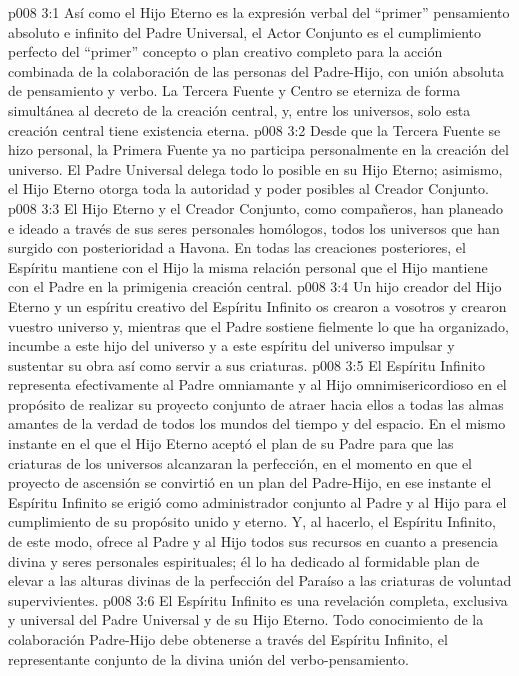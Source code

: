 \vs p008 3:1 Así como el Hijo Eterno es la expresión verbal del “primer” pensamiento absoluto e infinito del Padre Universal, el Actor Conjunto es el cumplimiento perfecto del “primer” concepto o plan creativo completo para la acción combinada de la colaboración de las personas del Padre\hyp{}Hijo, con unión absoluta de pensamiento y verbo. La Tercera Fuente y Centro se eterniza de forma simultánea al decreto de la creación central, y, entre los universos, solo esta creación central tiene existencia eterna.
\vs p008 3:2 Desde que la Tercera Fuente se hizo personal, la Primera Fuente ya no participa personalmente en la creación del universo. El Padre Universal delega todo lo posible en su Hijo Eterno; asimismo, el Hijo Eterno otorga toda la autoridad y poder posibles al Creador Conjunto.
\vs p008 3:3 El Hijo Eterno y el Creador Conjunto, como compañeros, han planeado e ideado a través de sus seres personales homólogos, todos los universos que han surgido con posterioridad a Havona. En todas las creaciones posteriores, el Espíritu mantiene con el Hijo la misma relación personal que el Hijo mantiene con el Padre en la primigenia creación central.
\vs p008 3:4 Un hijo creador del Hijo Eterno y un espíritu creativo del Espíritu Infinito os crearon a vosotros y crearon vuestro universo y, mientras que el Padre sostiene fielmente lo que ha organizado, incumbe a este hijo del universo y a este espíritu del universo impulsar y sustentar su obra así como servir a sus criaturas.
\vs p008 3:5 \pc El Espíritu Infinito representa efectivamente al Padre omniamante y al Hijo omnimisericordioso en el propósito de realizar su proyecto conjunto de atraer hacia ellos a todas las almas amantes de la verdad de todos los mundos del tiempo y del espacio. En el mismo instante en el que el Hijo Eterno aceptó el plan de su Padre para que las criaturas de los universos alcanzaran la perfección, en el momento en que el proyecto de ascensión se convirtió en un plan del Padre\hyp{}Hijo, en ese instante el Espíritu Infinito se erigió como administrador conjunto al Padre y al Hijo para el cumplimiento de su propósito unido y eterno. Y, al hacerlo, el Espíritu Infinito, de este modo, ofrece al Padre y al Hijo todos sus recursos en cuanto a presencia divina y seres personales espirituales; él lo ha dedicado  al formidable plan de elevar a las alturas divinas de la perfección del Paraíso a las criaturas de voluntad supervivientes.
\vs p008 3:6 El Espíritu Infinito es una revelación completa, exclusiva y universal del Padre Universal y de su Hijo Eterno. Todo conocimiento de la colaboración Padre\hyp{}Hijo debe obtenerse a través del Espíritu Infinito, el representante conjunto de la divina unión del verbo\hyp{}pensamiento.
